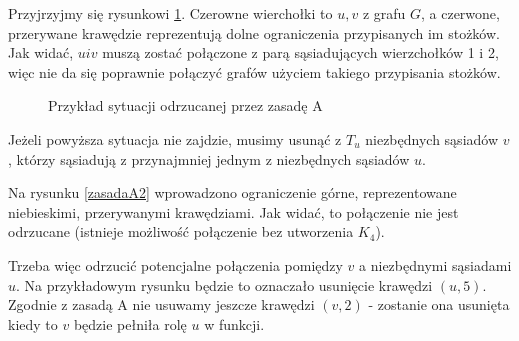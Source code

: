 Przyjrzyjmy się rysunkowi \ref{zasadaA1}. Czerowne wierchołki to $u, v$ z grafu $G$, 
a czerwone, przerywane krawędzie reprezentują dolne ograniczenia przypisanych im stożków.
Jak widać, $u i v$ muszą zostać połączone z parą sąsiadujących wierzchołków 1 i 2, więc nie 
da się poprawnie połączyć grafów użyciem takiego przypisania stożków.
\begin{figure}[H]
  \centering
 \caption{Przykład sytuacji odrzucanej przez zasadę A}
 \label{zasadaA1}
 \end{figure}

 Jeżeli powyższa sytuacja nie zajdzie, musimy usunąć z $T_u$ niezbędnych sąsiadów $v$, 
 którzy sąsiadują z przynajmniej jednym z niezbędnych sąsiadów $u$. 
 
  Na rysunku \ref{zasadaA2} wprowadzono ograniczenie górne, reprezentowane niebieskimi, 
  przerywanymi krawędziami.  Jak widać, to połączenie nie jest odrzucane (istnieje możliwość połączenie bez utworzenia $K_4$).
    
  Trzeba więc odrzucić potencjalne połączenia pomiędzy $v$ a niezbędnymi sąsiadami $u$. 
  Na przykładowym rysunku będzie to oznaczało usunięcie krawędzi $(u, 5)$. Zgodnie z zasadą A nie usuwamy jeszcze krawędzi 
  $(v,2)$ - zostanie ona usunięta kiedy to $v$ będzie pełniła rolę $u$ w funkcji.  

